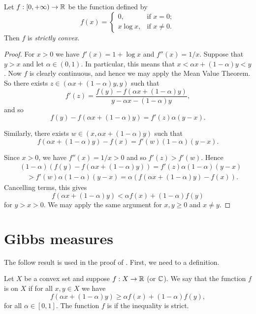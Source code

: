 \begin{theorem} \label{thm:walters-4-2-xlogx-convex}
	Let $f : [0, +\infty) \to \mathbb{R}$ be the function defined by
	\[
		f(x) =
		\begin{cases}
			0, & \text{if } x = 0; \\
			x\log{x}, & \text{if } x \neq 0.
		\end{cases}
	\]
	Then $f$ is \emph{strictly convex}.
	\begin{proof}
		For $x > 0$ we have $f'(x) = 1 + \log{x}$ and $f''(x) = 1 / x$. Suppose that $y > x$ and let $\alpha \in (0, 1)$. In particular, this means that $x < \alpha x + (1 - \alpha)y < y$. Now $f$ is clearly continuous, and hence we may apply the Mean Value Theorem. So there exists $z \in (\alpha x + (1 - \alpha)y, y)$ such that
		\[
			f'(z) = \frac{f(y) - f(\alpha x + (1 - \alpha)y)}{y - \alpha x - (1 - \alpha)y},
		\]
		and so
		\[
			f(y) - f(\alpha x + (1 - \alpha)y) = f'(z)\alpha(y - x).
		\]
		
		Similarly, there exists $w \in (x, \alpha x + (1 - \alpha)y)$ such that
		\[
			f(\alpha x + (1 - \alpha)y) - f(x) = f'(w)(1 - \alpha)(y - x).
		\]
		
		Since $x > 0$, we have $f''(x) = 1 / x > 0$ and so $f'(z) > f'(w)$. Hence
		\begin{align*}
			&(1 - \alpha)(f(y) - f(\alpha x + (1 - \alpha)y)) = f'(z)\alpha(1 - \alpha)(y - x) \\
			& \quad > f'(w)\alpha(1 - \alpha)(y - x) = \alpha(f(\alpha x + (1 - \alpha)y) - f(x)).
		\end{align*}
		Cancelling terms, this gives
		\[
			f(\alpha x + (1 - \alpha)y) < \alpha f(x) + (1 - \alpha)f(y)
		\]
		for $y > x > 0$. We may apply the same argument for $x, y \geq 0$ and $x \neq y$.
	\end{proof}
\end{theorem}

\section{Gibbs measures}
The follow result is used in the proof of . First, we need to a definition.

\begin{definition}
	Let $X$ be a convex set and suppose $f : X \to \mathbb{R}$ (or $\mathbb{C}$). We say that the function $f$ is  on $X$ if for all $x, y \in X$ we have
	\[
		f(\alpha x + (1 - \alpha)y) \geq \alpha f(x) + (1 - \alpha)f(y),
	\]
	for all $\alpha \in [0, 1]$. The function $f$ is  if the inequality is strict.~\cite[p11]{cambini-martein:generalized}
\end{definition}

